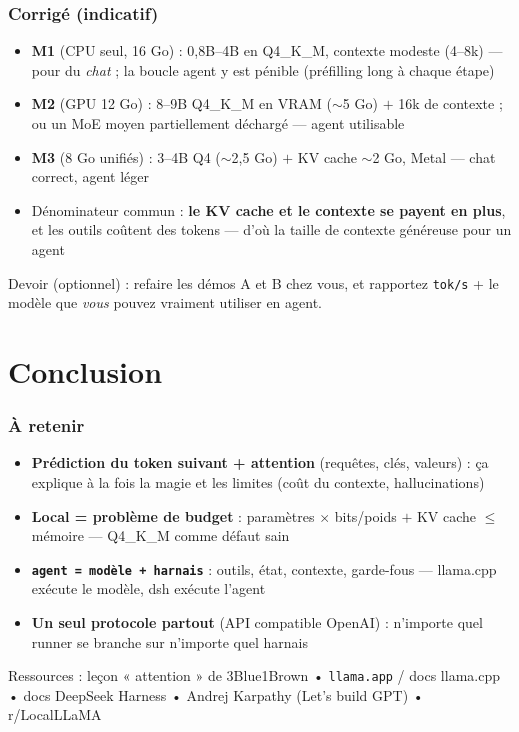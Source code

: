 \documentclass[
	11pt,
	aspectratio=169
]{beamer}
\begin{document}
\begin{frame}
    \frametitle{Corrigé (indicatif)}
    \begin{itemize}\setlength\itemsep{0.5em}
        \item \textbf{M1} (CPU seul, 16 Go) : 0{,}8B--4B en Q4\_K\_M, contexte modeste (4--8k) --- pour du \emph{chat} ; la boucle agent y est pénible (préfilling long à chaque étape)
        \item \textbf{M2} (GPU 12 Go) : 8--9B Q4\_K\_M en VRAM ($\sim$5 Go) $+$ 16k de contexte ; ou un MoE moyen partiellement déchargé --- agent utilisable
        \item \textbf{M3} (8 Go unifiés) : 3--4B Q4 ($\sim$2{,}5 Go) $+$ KV cache $\sim$2 Go, Metal --- chat correct, agent léger
        \item Dénominateur commun : \textbf{le KV cache et le contexte se payent en plus}, et les outils coûtent des tokens --- d'où la taille de contexte généreuse pour un agent
    \end{itemize}
    \vfill
    \begin{center}
        \small Devoir (optionnel) : refaire les démos A et B chez vous, et rapportez \texttt{tok/s} + le modèle que \emph{vous} pouvez vraiment utiliser en agent.
    \end{center}
\end{frame}

\section{Conclusion}

\begin{frame}
    \frametitle{À retenir}
    \begin{itemize}\setlength\itemsep{0.5em}
        \item \textbf{Prédiction du token suivant + attention} (requêtes, clés, valeurs) : ça explique à la fois la magie et les limites (coût du contexte, hallucinations)
        \item \textbf{Local = problème de budget} : paramètres $\times$ bits/poids $+$ KV cache $\le$ mémoire --- Q4\_K\_M comme défaut sain
        \item \texttt{\textbf{agent = modèle + harnais}} : outils, état, contexte, garde-fous --- llama.cpp exécute le modèle, dsh exécute l'agent
        \item \textbf{Un seul protocole partout} (API compatible OpenAI) : n'importe quel runner se branche sur n'importe quel harnais
    \end{itemize}
    \vfill
    \small Ressources : leçon « attention » de 3Blue1Brown \quad • \texttt{llama.app} / docs llama.cpp \quad • docs DeepSeek Harness \quad • Andrej Karpathy (\og Let's build GPT\fg) \quad • r/LocalLLaMA
\end{frame}
\end{document}
